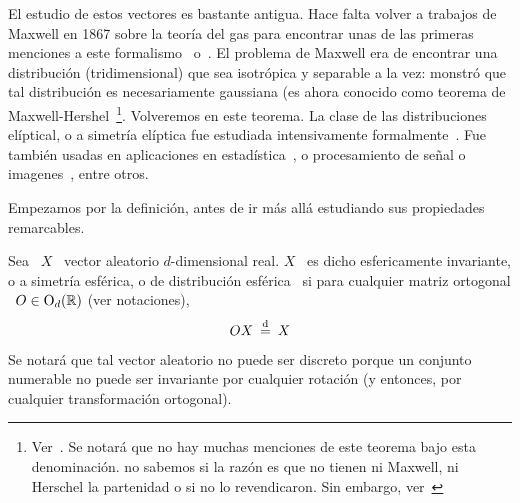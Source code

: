 \label{Ssec:MP:FamiliaEliptica}



\label{Ssec:MP:FamiliaElipticaReal}


El estudio de  estos vectores es bastante antigua. Hace  falta volver a trabajos
de Maxwell en 1867 sobre la teor\'ia del gas para encontrar unas de las primeras
menciones  a este  formalismo~\cite{Max67}  o~\cite[pp.~377--391]{Nie52:v1}.  El
problema de Maxwell era de encontrar una distribuci\'on (tridimensional) que sea
isotr\'opica  y  separable  a  la  vez:  monstr\'o  que  tal  distribuci\'on  es
necesariamente    gaussiana    (es    ahora    conocido    como    teorema    de
Maxwell-Hershel~\footnote{Ver~\cite[Prop.~4.11]{BilBre99}.   Se notar\'a  que no
  hay muchas menciones  de este teorema bajo esta  denominaci\'on. no sabemos si
  la raz\'on es que  no tienen ni Maxwell, ni Herschel la  partenidad o si no lo
  revendicaron. Sin embargo, ver~\cite{Max67}}.   Volveremos en este teorema. La
clase de las distribuciones el\'iptical, o a simetr\'ia el\'iptica fue estudiada
intensivamente  formalmente~\cite{Bar34,  Bar34:07,  Ver64, McgWag68,  CamHua81,
  Eat81,  Kan94,  Lau75,  Yao73,  KotNad01,  FanKot90,  Mui82,  BilBre99}.   Fue
tambi\'en  usadas   en  aplicaciones  en   estad\'istica~\cite{BlaTho68,  Chu73,
  YanKot03,  ArePin06,  BauPas07,  ChiPas08},   o  procesamiento  de  se\~nal  o
imagenes~\cite{Gol76, RanWei93, RanWei95, ZozVig10, Zoz12}, entre otros.

Empezamos  por  la  definici\'on,  antes  de  ir  m\'as  all\'a  estudiando  sus
propiedades remarcables.

\begin{definicion}
  Sea  \  $X$  \  vector   aleatorio  $d$-dimensional  real.   $X$  \  es  dicho
  esfericamente  invariante,  o a  simetr\'ia  esf\'erica,  o de  distribuci\'on
  esf\'erica \ si  para cualquier matriz ortogonal \  $O \in \mathrm{O}_d(\mathbb{R})$ (ver
  notaciones),
  \[
  O  X  \: \stackrel{\mathrm{d}}{=}  \: X
  \]
\end{definicion}

Se notar\'a  que tal vector aleatorio  no puede ser discreto  porque un conjunto
numerable  no puede  ser invariante  por cualquier  rotaci\'on (y  entonces, por
cualquier transformaci\'on ortogonal).

